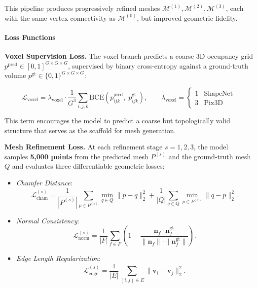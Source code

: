 This pipeline produces progressively refined meshes \( \mathcal{M}^{(1)}, \mathcal{M}^{(2)}, \mathcal{M}^{(3)} \), each with the same vertex connectivity as \( \mathcal{M}^{(0)} \), but improved geometric fidelity.

\paragraph{Loss Functions}

\medskip
\noindent
\textbf{Voxel Supervision Loss.}  
The voxel branch predicts a coarse 3D occupancy grid \( p^{\text{pred}} \in [0,1]^{G \times G \times G} \), supervised by binary cross-entropy against a ground-truth volume \( p^{\text{gt}} \in \{0,1\}^{G \times G \times G} \):

\[
\mathcal{L}_{\text{voxel}} = 
\lambda_{\text{voxel}} \cdot 
\frac{1}{G^3} \sum_{i,j,k} 
\mathrm{BCE}\left(p^{\text{pred}}_{ijk},\; p^{\text{gt}}_{ijk}\right),
\qquad
\lambda_{\text{voxel}} =
\begin{cases}
    1 & \text{ShapeNet} \\
    3 & \text{Pix3D}
\end{cases}
\]

This term encourages the model to predict a coarse but topologically valid structure that serves as the scaffold for mesh generation.

\medskip
\noindent
\textbf{Mesh Refinement Loss.}  
At each refinement stage \( s = 1, 2, 3 \), the model samples \textbf{5{,}000 points} from the predicted mesh \( P^{(s)} \) and the ground-truth mesh \( Q \) and evaluates three differentiable geometric losses:

\begin{itemize}
    \item \emph{Chamfer Distance}:
    \[
    \mathcal{L}_{\text{cham}}^{(s)} = 
    \frac{1}{|P^{(s)}|} \sum_{p \in P^{(s)}} \min_{q \in Q} \|p - q\|_2^2 
    + \frac{1}{|Q|} \sum_{q \in Q} \min_{p \in P^{(s)}} \|q - p\|_2^2.
    \]
    
    \item \emph{Normal Consistency}:
    \[
    \mathcal{L}_{\text{norm}}^{(s)} = 
    \frac{1}{|F|} \sum_{f \in F} 
    \left(1 - \frac{\mathbf{n}_f \cdot \mathbf{n}_f^{\text{gt}}}
    {\|\mathbf{n}_f\| \cdot \|\mathbf{n}_f^{\text{gt}}\|} \right).
    \]
    
    \item \emph{Edge Length Regularization}:
    \[
    \mathcal{L}_{\text{edge}}^{(s)} = 
    \frac{1}{|E|} \sum_{(i,j) \in E} \|\mathbf{v}_i - \mathbf{v}_j\|_2^2.
    \]
\end{itemize}

